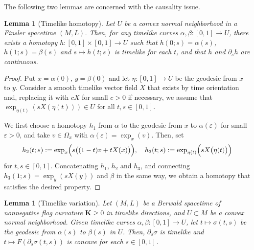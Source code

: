 \documentclass[a4paper,11pt]{article}
\numberwithin{equation}{section}
\theoremstyle{definition}
\theoremstyle{plain}
\newtheorem{lemma}[definition]{Lemma}
\newcommand{\del}{\partial}
\newcommand{\lra}{\longrightarrow}
\newcommand{\ve}{\varepsilon}
\newcommand{\bK}{\mathbf{K}}
\begin{document}
The following two lemmas are concerned with the causality issue.

\begin{lemma}[Timelike homotopy]
\label{lem: timelike homotopy}
Let $U$ be a convex normal neighborhood in a Finsler spacetime $(M,L)$.
Then, for any timelike curves $\alpha,\beta \colon [0,1] \lra U$,
there exists a homotopy $h\colon [0,1] \times [0,1] \lra U$ such that $h(0;s)=\alpha(s)$, $h(1;s)=\beta(s)$ and $s \longmapsto h(t;s)$ is timelike for each $t$,
and that $h$ and $\partial_s h$ are continuous.
\end{lemma}

\begin{proof}
Put $x=\alpha(0)$, $y=\beta(0)$ and let $\eta\colon [0,1] \lra U$ be the geodesic from $x$ to $y$.
Consider a smooth timelike vector field $X$ that exists by time orientation and,
replacing it with $cX$ for small $c>0$ if necessary, we assume that $\exp_{\eta(t)}(sX(\eta(t))) \in U$ for all $t,s\in[0,1]$.

We first choose a homotopy $h_1$ from $\alpha$ to the geodesic from $x$ to $\alpha(\ve)$ for small $\ve>0$, and take $v \in \Omega_x$ with $\alpha(\ve)=\exp_x(v)$.
Then, set
\[ h_2(t;s):=\exp_x \Bigl( s\bigl( (1-t)v+tX(x) \bigr) \Bigr),\quad
h_3(t;s):=\exp_{\eta(t)}\Bigl( sX\bigr( \eta(t) \bigr) \Bigr) \]
for $t,s \in [0,1]$.
Concatenating $h_1$, $h_2$ and $h_3$,
and connecting $h_3(1;s)=\exp_y(sX(y))$ and $\beta$ in the same way, we obtain a homotopy that satisfies the desired property.
\end{proof}


\begin{lemma}[Timelike variation]
\label{lem: VtimeGen}
Let $(M,L)$ be a Berwald spacetime of nonnegative flag curvature $\bK \ge 0$ in timelike directions,
and $U \subset M$ be a convex normal neighborhood.
Given timelike curves $\alpha,\beta\colon [0,1] \lra U$, let $t\longmapsto \sigma(t,s)$ be the geodesic from $\alpha(s)$ to $\beta(s)$ in $U$.
Then, $\partial_s \sigma$ is timelike and $t \longmapsto F(\del_s \sigma(t,s))$ is concave for each $s \in [0,1]$.
\end{lemma}
\end{document}
